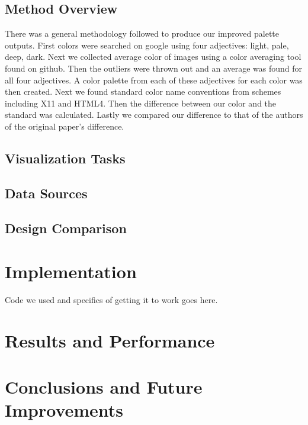 \documentclass[journal]{vgtc}                %
\begin{document}
\subsection{Method Overview}
There was a general methodology followed to produce our improved palette outputs.
First colors were searched on google using four adjectives: light, pale, deep, dark.
Next we collected average color of images using a color averaging tool found on github. \cite{avg}
Then the outliers were thrown out and an average was found for all four adjectives.
A color palette from each of these adjectives for each color was then created.
Next we found standard color name conventions from schemes including X11 and HTML4.
Then the difference between our color and the standard was calculated.
Lastly we compared our difference to that of the authors of the original paper’s difference.

\subsection{Visualization Tasks}


\subsection{Data Sources}


\subsection{Design Comparison}


\section{Implementation}
Code we used and specifics of getting it to work goes here.


\section{Results and Performance}


\section{Conclusions and Future Improvements}


%

%
%
%


\end{document}
